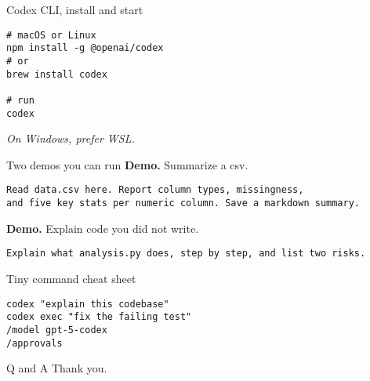 \documentclass[aspectratio=169,professionalfonts]{beamer}
\newcommand{\demo}{\textbf{Demo. }}
\newcommand{\notepara}[1]{\small\textit{#1}}
\begin{document}
\begin{frame}[fragile]{Codex CLI, install and start}
\begin{verbatim}
# macOS or Linux
npm install -g @openai/codex
# or
brew install codex

# run
codex
\end{verbatim}
\notepara{On Windows, prefer WSL.}
\end{frame}

\begin{frame}[fragile]{Two demos you can run}
\demo Summarize a csv.
\begin{verbatim}
Read data.csv here. Report column types, missingness,
and five key stats per numeric column. Save a markdown summary.
\end{verbatim}

\demo Explain code you did not write.
\begin{verbatim}
Explain what analysis.py does, step by step, and list two risks.
\end{verbatim}
\end{frame}

\begin{frame}[fragile]{Tiny command cheat sheet}
\begin{verbatim}
codex "explain this codebase"
codex exec "fix the failing test"
/model gpt-5-codex
/approvals
\end{verbatim}
\end{frame}

\begin{frame}{Q and A}
  \centering Thank you.
\end{frame}
\end{document}
